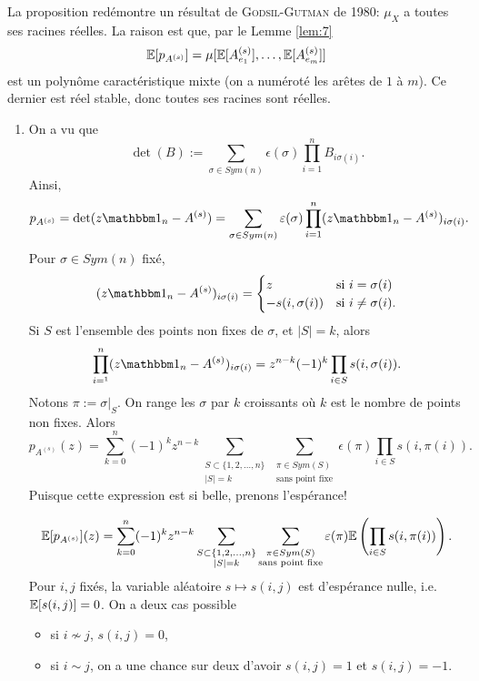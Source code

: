 La proposition redémontre un résultat de \textsc{Godsil-Gutman} de 1980: $\mu_X$ a toutes ses racines
réelles. La raison est que, par le Lemme \ref{lem:7} 
\[ \mathbb{E}[p_{A^{(s)}}] = \mu[\mathbb{E}[A_{e_1}^{(s)}], \ldots , \mathbb{E}[A_{e_m}^{(s)}]] \]
est un polynôme caractéristique mixte (on a numéroté les arêtes de $1$ à $m$). Ce dernier est réel stable,
donc toutes ses racines sont réelles.

\begin{preuve}[de la Proposition]
  \begin{enumerate}
  \item On a vu que 
    \[ \det(B) := \sum_{\sigma \in Sym(n)}^{} \epsilon(\sigma) \prod_{i=1}^n B_{i \sigma(i)}.  \]
    Ainsi, 
    \[ p_{A^{(s)}} = \det(z \un_n - A^{(s)}) = \sum_{\sigma \in Sym(n)}^{} \epsilon(\sigma) \prod_{i=1}^n (z
      \un_n - A^{(s)})_{i \sigma(i)}. \]
    Pour $\sigma \in Sym(n)$ fixé, 
    \[ (z \un_n - A^{(s)})_{i \sigma(i)} =
      \begin{cases}
        z & \text{si } i = \sigma(i)\\
        -s(i, \sigma(i)) & \text{si } i \neq \sigma(i).
      \end{cases}
    \]
    Si $S$ est l'ensemble des points non fixes de $\sigma$, et $|S| = k$, alors 
    \[ \prod_{i =^1}^{n}(z \un_n - A^{(s)})_{i \sigma(i)} = z^{n-k} (-1)^k \prod_{i \in S} s(i, \sigma(i)).\]
    Notons $\pi := \sigma|_S$. On range les $\sigma$ par $k$ croissants où $k$ est le nombre de points non
    fixes. Alors 
    \[ p_{A^{(s)}}(z) = \sum_{k = 0}^{n} (-1)^k z^{n-k} \sum_{\substack{S \subset \{1, 2, \ldots , n\}\\
          |S|=k}}^{} \sum_{\substack{\pi \in Sym(S)\\\text{sans point fixe}}}^{} \epsilon(\pi) \prod_{i \in
        S} s(i, \pi(i)). \]
    Puisque cette expression est si belle, prenons l'espérance!
    
    \[ \mathbb{E}[p_{A^{(s)}}](z) = \sum_{k=0}^{n} (-1)^k z^{n-k} \sum_{\substack{S \subset \{1, 2, \ldots , n\}\\
          |S|=k}}^{} \sum_{\substack{\pi \in Sym(S)\\\text{sans point fixe}}}^{} \varepsilon(\pi)
      \mathbb{E}\left(\prod_{i \in S} s(i, \pi(i))\right). \]
    Pour $i,j$ fixés, la variable aléatoire $s \mapsto s(i,j)$ est d'espérance nulle, i.e. $\mathbb{E}[s(i,j)] =
    0$. On a deux cas possible
    \begin{itemize}
    \item si $i \not \sim j$, $s(i,j) = 0$,
    \item si $i \sim j$, on a une chance sur deux d'avoir $s(i,j) = 1$ et $s(i,j) = -1$.
    \end{itemize}


\end{enumerate}
\end{preuve}
